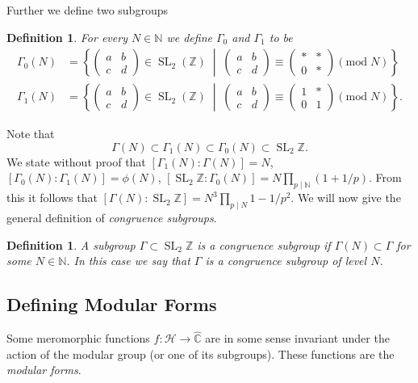 \documentclass[a4paper]{article}
\theoremstyle{theoremdd}
\theoremstyle{definitiondd}
\newtheorem{definition}[theorem]{Definition}
\theoremstyle{remarkdd}
\newcommand{\N}{\mathbb{N}}
\newcommand{\Z}{\mathbb{Z}}
\newcommand{\C}{\mathbb{C}}
\newcommand{\bigset}[2]{ \left\{ #1 \;\middle|\; #2 \right\} }
\DeclareMathOperator{\SL}{SL}
\begin{document}
Further we define two subgroups
\begin{definition}
	For every $N \in \N$ we define $\Gamma_0$ and $\Gamma_1$ to be 
	\begin{align*}
		\Gamma_0(N) &= \bigset{\begin{pmatrix} a & b \\ c & d \end{pmatrix} \in \SL_2(\Z)}{\begin{pmatrix} a & b \\ c & d \end{pmatrix}  \equiv \begin{pmatrix} * & * \\ 0 & * \end{pmatrix}  (\mathrm{mod}\; N)} \\
		\Gamma_1(N) &= \bigset{\begin{pmatrix} a & b \\ c & d \end{pmatrix} \in \SL_2(\Z)}{\begin{pmatrix} a & b \\ c & d \end{pmatrix}  \equiv \begin{pmatrix} 1 & * \\ 0 & 1 \end{pmatrix}  (\mathrm{mod}\; N)}
	.\end{align*}
\end{definition} 
Note that 
\[
	\Gamma(N) \subset \Gamma_1(N) \subset \Gamma_0(N) \subset  \SL_2\Z
.\] 
We state without proof that $[\Gamma_1(N): \Gamma(N)] = N$, $[\Gamma_0 (N): \Gamma_1(N)]= \phi(N)$, $[\SL_2\Z: \Gamma_0(N)] = N \prod_{p \mathbin | \N}(1 + 1 /p)$. 
From this it follows that $[\Gamma(N): \SL_2\Z]= N^3 \prod_{p \mathbin | N} 1 - 1 /p^2$.
We will now give the general definition of \emph{congruence subgroups}. 
 \begin{definition}
	 A subgroup $\Gamma \subset \SL_2\Z$ is a \emph{congruence subgroup} if $\Gamma(N) \subset \Gamma$ for some $N \in \N$. In this case we say that $\Gamma$ is a congruence subgroup of level $N$. 
\end{definition}
\subsection{Defining Modular Forms}\label{sec:defining_modular_forms}

Some meromorphic functions $f:\mathcal{H}  \to \hat{\C}$ are in some sense invariant under the action of the modular group (or one of its subgroups). 
These functions are the \emph{modular forms}.
\end{document}
